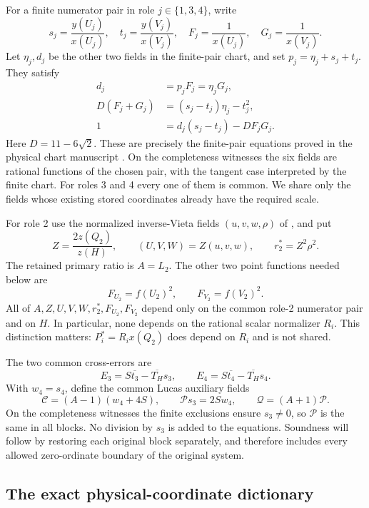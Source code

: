 \documentclass[11pt]{article}
\begin{document}
For a finite numerator pair in role \(j\in\{1,3,4\}\), write
\[
 s_j=\frac{y(U_j)}{x(U_j)},\quad
 t_j=\frac{y(V_j)}{x(V_j)},\quad
 F_j=\frac1{x(U_j)},\quad G_j=\frac1{x(V_j)}.
\]
Let \(\eta_j,d_j\) be the other two fields in the finite-pair chart,
and set \(p_j=\eta_j+s_j+t_j\).  They satisfy
\begin{align}
 d_j&=p_jF_j=\eta_jG_j,\label{eq:common-finite-pair-1}\\
 D(F_j+G_j)&=(s_j-t_j)\eta_j-t_j^2,\label{eq:common-finite-pair-2}\\
 1&=d_j(s_j-t_j)-DF_jG_j.\label{eq:common-finite-pair-3}
\end{align}
Here \(D=11-6\sqrt2\).  These are precisely the finite-pair equations
proved in the physical chart manuscript \cite{physical}.  On the
completeness witnesses the six fields are rational functions of the
chosen pair, with the tangent case interpreted by the finite chart.
For roles 3 and 4 every one of them is common.  We share only the fields
whose existing stored coordinates already have the required scale.

For role 2 use the normalized inverse-Vieta fields
\((u,v,w,\rho)\) of \cite{scalar}, and put
\[
 Z=\frac{2z(Q_2)}{z(H)},\qquad
 (U,V,W)=Z(u,v,w),\qquad r_2^*=Z^2\rho^2.
\]
The retained primary ratio is \(A=L_2\).  The other two point functions
needed below are
\[
                F_{U_2}=f(U_2)^2,\qquad F_{V_2}=f(V_2)^2.
\]
All of \(A,Z,U,V,W,r_2^*,F_{U_2},F_{V_2}\) depend only on the
common role-2 numerator pair and on \(H\).  In particular, none depends
on the rational scalar normalizer \(R_i\).  This distinction matters:
\(P_i^*=R_i x(Q_2)\) does depend on \(R_i\) and is not shared.

The two common cross-errors are
\[
 E_3=S\overline{t_3}-\overline{T_H}s_3,
 \qquad E_4=S\overline{t_4}-\overline{T_H}s_4.
\]
With \(w_4=s_4\), define the common Lucas auxiliary fields
\begin{equation}\label{eq:common-lucas-fields}
 \mathcal C=(A-1)(w_4+4S),\qquad
 \mathcal P s_3=2Sw_4,\qquad
 \mathcal Q=(A+1)\mathcal P.
\end{equation}
On the completeness witnesses the finite exclusions ensure \(s_3\ne0\),
so \(\mathcal P\) is the same in all blocks.  No division by \(s_3\)
is added to the equations.  Soundness will follow by restoring each
original block separately, and therefore includes every allowed
zero-ordinate boundary of the original system.

\subsection{The exact physical-coordinate dictionary}
\end{document}
